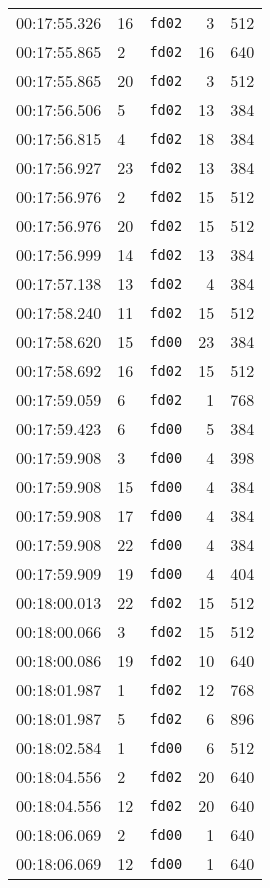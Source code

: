 \documentclass{article}
\begin{document}
\begin{longtable}{lllrr}
00:17:55.326 & 16 & \texttt{fd02} & 3 & 512 \\
00:17:55.865 & 2 & \texttt{fd02} & 16 & 640 \\
00:17:55.865 & 20 & \texttt{fd02} & 3 & 512 \\
00:17:56.506 & 5 & \texttt{fd02} & 13 & 384 \\
00:17:56.815 & 4 & \texttt{fd02} & 18 & 384 \\
00:17:56.927 & 23 & \texttt{fd02} & 13 & 384 \\
00:17:56.976 & 2 & \texttt{fd02} & 15 & 512 \\
00:17:56.976 & 20 & \texttt{fd02} & 15 & 512 \\
00:17:56.999 & 14 & \texttt{fd02} & 13 & 384 \\
00:17:57.138 & 13 & \texttt{fd02} & 4 & 384 \\
00:17:58.240 & 11 & \texttt{fd02} & 15 & 512 \\
00:17:58.620 & 15 & \texttt{fd00} & 23 & 384 \\
00:17:58.692 & 16 & \texttt{fd02} & 15 & 512 \\
00:17:59.059 & 6 & \texttt{fd02} & 1 & 768 \\
00:17:59.423 & 6 & \texttt{fd00} & 5 & 384 \\
00:17:59.908 & 3 & \texttt{fd00} & 4 & 398 \\
00:17:59.908 & 15 & \texttt{fd00} & 4 & 384 \\
00:17:59.908 & 17 & \texttt{fd00} & 4 & 384 \\
00:17:59.908 & 22 & \texttt{fd00} & 4 & 384 \\
00:17:59.909 & 19 & \texttt{fd00} & 4 & 404 \\
00:18:00.013 & 22 & \texttt{fd02} & 15 & 512 \\
00:18:00.066 & 3 & \texttt{fd02} & 15 & 512 \\
00:18:00.086 & 19 & \texttt{fd02} & 10 & 640 \\
00:18:01.987 & 1 & \texttt{fd02} & 12 & 768 \\
00:18:01.987 & 5 & \texttt{fd02} & 6 & 896 \\
00:18:02.584 & 1 & \texttt{fd00} & 6 & 512 \\
00:18:04.556 & 2 & \texttt{fd02} & 20 & 640 \\
00:18:04.556 & 12 & \texttt{fd02} & 20 & 640 \\
00:18:06.069 & 2 & \texttt{fd00} & 1 & 640 \\
00:18:06.069 & 12 & \texttt{fd00} & 1 & 640 \\

\end{longtable}
\end{document}

